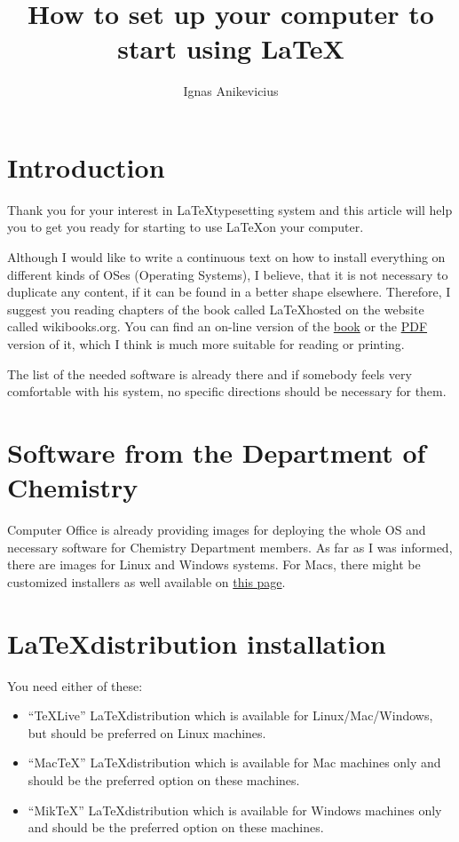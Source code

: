 \documentclass[a4paper]{article}
\title{How to set up your computer to start using LaTeX}
\author{Ignas Anikevicius}
\begin{document}
\maketitle

\section{Introduction}

Thank you for your interest in \LaTeX typesetting system and this article
will help you to get you ready for starting to use \LaTeX on your
computer.

Although I would like to write a continuous text on how to install
everything on different kinds of OSes (Operating Systems), I believe, that it
is not necessary to duplicate any content, if it can be found in a better
shape elsewhere. Therefore, I suggest you reading chapters of the book called
\LaTeX hosted on the website called wikibooks.org. You can find an on-line
version of the
\href{https://secure.wikimedia.org/wikibooks/en/wiki/LaTeX}{book} or the
\href{http://upload.wikimedia.org/wikipedia/commons/2/2d/LaTeX.pdf}{PDF}
version of it, which I think is much more suitable for reading or printing.

The list of the needed software is already there and if somebody feels very
comfortable with his system, no specific directions should be necessary for
them.

\section{Software from the Department of Chemistry}

Computer Office is already providing images for deploying the whole OS and
necessary software for Chemistry Department members. As far as I was informed,
there are images for Linux and Windows systems. For Macs, there might be
customized installers as well available on \href{http://www.google.co.uk}{this
page}.

\section{\LaTeX distribution installation}

You need either of these:
\begin{itemize}
    \item ``\TeX Live'' \LaTeX distribution which is available for
        Linux/Mac/Windows, but should be preferred on Linux machines.
    \item ``MacTeX'' \LaTeX distribution which is available for Mac machines
        only and should be the preferred option on these machines.
    \item ``MikTeX'' \LaTeX distribution which is available for Windows machines
        only and should be the preferred option on these machines.
\end{itemize}
\end{document}
